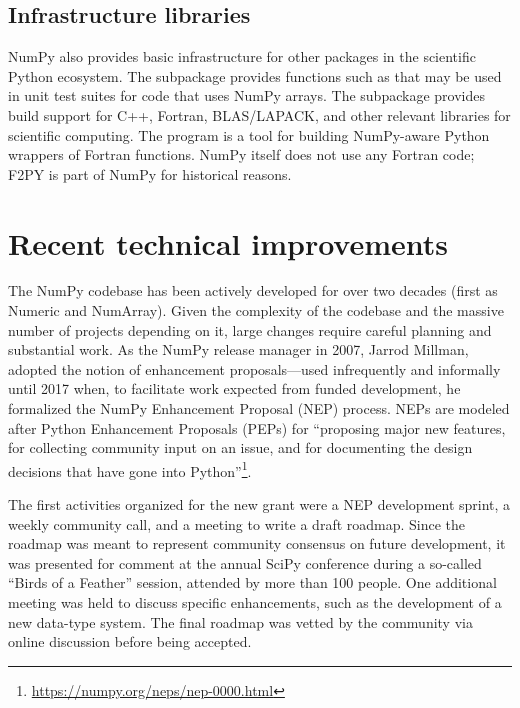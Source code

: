 \subsection{Infrastructure libraries}

NumPy also provides basic infrastructure for other packages in the scientific
Python ecosystem.
The  subpackage provides functions such as
 that may be used in unit
test suites for code that uses NumPy arrays.
The  subpackage provides build support for C++, Fortran,
BLAS/LAPACK, and other relevant libraries for scientific computing.
The program  is a tool for
building NumPy-aware Python wrappers of Fortran functions.
NumPy itself does not use any Fortran code;  F2PY is part of NumPy
for historical reasons.

\section{Recent technical improvements}

The NumPy codebase has been actively developed for over two decades (first as
Numeric and NumArray).
Given the complexity of the codebase and the massive number of projects depending
on it, large changes require careful planning and substantial work.
As the NumPy release manager in 2007, Jarrod Millman, adopted the notion
of enhancement proposals---used infrequently and informally until 2017 when,
to facilitate work expected from funded development, he formalized the
NumPy Enhancement Proposal (NEP) process.  NEPs are modeled after
Python Enhancement Proposals (PEPs) for ``proposing major new
features, for collecting community input on an issue, and for
documenting the design decisions that have gone into
Python''\footnote{\url{https://numpy.org/neps/nep-0000.html}}.

The first activities organized for the new grant were a NEP development
sprint, a weekly community call, and a meeting to write a draft roadmap.
Since the roadmap was meant to represent community consensus on future
development, it was presented for comment at the annual SciPy
conference during a so-called ``Birds of a Feather'' session, attended
by more than 100 people.  One additional meeting was held to discuss
specific enhancements, such as the development of a new data-type
system.  The final roadmap was vetted by the community via online
discussion before being accepted.


